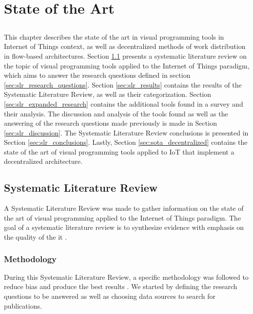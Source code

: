 \chapter{State of the Art} \label{chap:sota} \minitoc

\section*{}


This chapter describes the state of the art in visual programming tools in Internet of Things context, as well as decentralized methods of work distribution in flow-based architectures. Section \ref{sec:slr} presents a systematic literature review on the topic of visual programming tools applied to the Internet of Things paradigm, which aims to answer the research questions defined in section \ref{sec:slr_research_questions}. Section \ref{sec:slr_results} contains the results of the Systematic Literature Review, as well as their categorization. Section \ref{sec:slr_expanded_research} contains the additional tools found in a survey and their analysis. The discussion and analysis of the tools found as well as the answering of the research questions made previously is made in Section \ref{sec:slr_discussion}. The Systematic Literature Review conclusions is presented in Section \ref{sec:slr_conclusions}. Lastly, Section \ref{sec:sota_decentralized} contains the state of the art of visual programming tools applied to IoT that implement a decentralized architecture.

\section{Systematic Literature Review}\label{sec:slr}

A Systematic Literature Review was made to gather information on the state of the art of visual programming applied to the Internet of Things paradigm. The goal of a systematic literature review is to synthesize evidence with emphasis on the quality of the it \cite{SLR_guidelines}.

\subsection{Methodology}\label{sec:methodology}

During this Systematic Literature Review, a specific methodology was followed to reduce bias and produce the best results \cite{SLR_guidelines}.
We started by defining the research questions to be answered as well as choosing data sources to search for publications.

